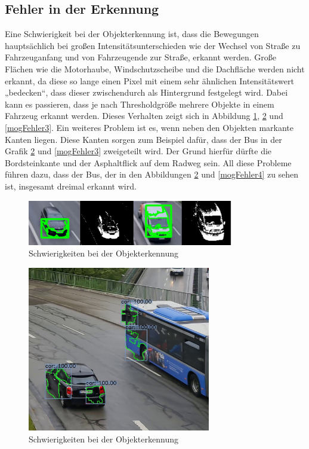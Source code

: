 \documentclass[conference]{IEEEtran}
\begin{document}
	\subsection{Fehler in der Erkennung}
	Eine Schwierigkeit bei der Objekterkennung ist, dass die Bewegungen hauptsächlich bei großen Intensitätsunterschieden wie der Wechsel von Straße zu Fahrzeuganfang und von Fahrzeugende zur Straße, erkannt werden. Große Flächen wie die Motorhaube, Windschutzscheibe und die Dachfläche werden nicht erkannt, da diese so lange einen Pixel mit einem sehr ähnlichen Intensitätswert „bedecken“, dass dieser zwischendurch als Hintergrund festgelegt wird. Dabei kann es passieren, dass je nach Thresholdgröße mehrere Objekte in einem Fahrzeug erkannt werden. Dieses Verhalten zeigt sich in Abbildung \ref{mogFehler1}, \ref{mogFehler2} und \ref{mogFehler3}. Ein weiteres Problem ist es, wenn neben den Objekten markante Kanten liegen. Diese Kanten sorgen zum Beispiel dafür, dass der Bus in der Grafik \ref{mogFehler2} und \ref{mogFehler3} zweigeteilt wird. Der Grund hierfür dürfte die Bordsteinkante und der Asphaltflick auf dem Radweg sein. All diese Probleme führen dazu, dass der Bus, der in den Abbildungen \ref{mogFehler2} und \ref{mogFehler4} zu sehen ist, insgesamt dreimal erkannt wird. %
	\begin{figure}[!h]
		\begin{center}
			\includegraphics[width=9cm]{Media/MOGVergleich.png}
			\caption{Schwierigkeiten bei der Objekterkennung}
			\label{mogFehler1}
		\end{center}
	\end{figure}
	\begin{figure}[!h]
		\begin{center}
			\includegraphics[width=8cm]{Media/Output_733.jpg}
			\caption{Schwierigkeiten bei der Objekterkennung}
			\label{mogFehler2}
		\end{center}
	\end{figure}
\end{document}
